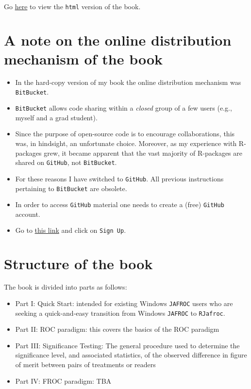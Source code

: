 \documentclass[
]{book}
\providecommand{\tightlist}{%
  \setlength{\itemsep}{0pt}\setlength{\parskip}{0pt}}
\begin{document}
Go \href{https://dpc10ster.github.io/RJafrocFrocBook/}{here} to view the \texttt{html} version of the book.

\hypertarget{a-note-on-the-online-distribution-mechanism-of-the-book}{%
\section*{A note on the online distribution mechanism of the book}\label{a-note-on-the-online-distribution-mechanism-of-the-book}}

\begin{itemize}
\tightlist
\item
  In the hard-copy version of my book \citep{chakraborty2017observer} the online distribution mechanism was \texttt{BitBucket}.
\item
  \texttt{BitBucket} allows code sharing within a \emph{closed} group of a few users (e.g., myself and a grad student).
\item
  Since the purpose of open-source code is to encourage collaborations, this was, in hindsight, an unfortunate choice. Moreover, as my experience with R-packages grew, it became apparent that the vast majority of R-packages are shared on \texttt{GitHub}, not \texttt{BitBucket}.
\item
  For these reasons I have switched to \texttt{GitHub}. All previous instructions pertaining to \texttt{BitBucket} are obsolete.
\item
  In order to access \texttt{GitHub} material one needs to create a (free) \texttt{GitHub} account.
\item
  Go to \href{https://github.com}{this link} and click on \texttt{Sign\ Up}.
\end{itemize}

\hypertarget{structure-of-the-book}{%
\section*{Structure of the book}\label{structure-of-the-book}}

The book is divided into parts as follows:

\begin{itemize}
\tightlist
\item
  Part I: Quick Start: intended for existing Windows \texttt{JAFROC} users who are seeking a quick-and-easy transition from Windows \texttt{JAFROC} to \texttt{RJafroc}.
\item
  Part II: ROC paradigm: this covers the basics of the ROC paradigm
\item
  Part III: Significance Testing: The general procedure used to determine the significance level, and associated statistics, of the observed difference in figure of merit between pairs of treatments or readers
\item
  Part IV: FROC paradigm: TBA
\end{itemize}
\end{document}
